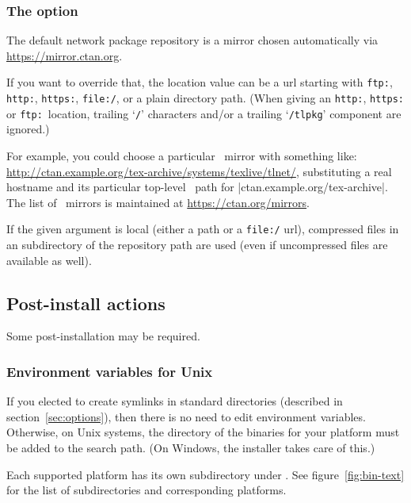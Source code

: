 \documentclass[12pt]{article}
\begin{document}
\subsubsection{The  option}
\label{sec:location}

The default network package repository is a \CTAN{} mirror chosen
automatically via \url{https://mirror.ctan.org}.

If you want to override that, the location value can be a url
starting with \texttt{ftp:}, \texttt{http:}, \texttt{https:},
\texttt{file:/}, or a plain directory path.  (When giving an
\texttt{http:}, \texttt{https:} or \texttt{ftp:}\ location, trailing
`\texttt{/}' characters and/or a trailing `\texttt{/tlpkg}'
component are ignored.)

For example, you could choose a particular \CTAN\ mirror with something
like: \url{http://ctan.example.org/tex-archive/systems/texlive/tlnet/},
substituting a real hostname and its particular top-level \CTAN\ path
for |ctan.example.org/tex-archive|.  The list of \CTAN\ mirrors is
maintained at \url{https://ctan.org/mirrors}.

If the given argument is local (either a path or a \texttt{file:/} url),
compressed files in an  subdirectory of the repository
path are used (even if uncompressed files are available as well).

\subsection{Post-install actions}
\label{sec:postinstall}

Some post-installation may be required.

\subsubsection{Environment variables for Unix}
\label{sec:env}

If you elected to create symlinks in standard directories (described in
section~\ref{sec:options}), then there is no need to edit environment
variables.  Otherwise, on Unix systems, the directory of the binaries
for your platform must be added to the search path.  (On Windows, the
installer takes care of this.)

Each supported platform has its own subdirectory under
. See figure~\ref{fig:bin-text} for the list of
subdirectories and corresponding platforms.
\end{document}

